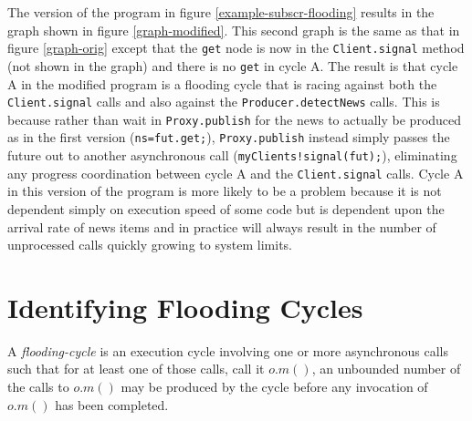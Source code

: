 \documentclass[12pt]{article}%
\begin{document}
The version of the program in figure \ref{example-subscr-flooding}
results in the graph shown in figure \ref{graph-modified}. This second graph is the same as that in figure \ref{graph-orig}
except that the \lstinline{get} node is now in the  \lstinline{Client.signal}
method (not shown in the graph) and there is no \lstinline{get} in cycle A. 
The result is that cycle A in the modified program
is a flooding cycle that is racing against both the
\lstinline{Client.signal} calls and also against the
\lstinline{Producer.detectNews} calls.  This is because rather than
wait in \lstinline{Proxy.publish} for the news to actually be produced
as in the first version (\lstinline{ns=fut.get;}),
\lstinline{Proxy.publish} instead simply passes the future out to
another asynchronous call (\lstinline{myClients!signal(fut);}),
eliminating any progress coordination between cycle A and the
\lstinline{Client.signal} calls. Cycle A in this version of the program is more likely to be a
problem because it is not dependent simply on execution speed of some
code but is dependent upon the arrival rate of news items and in
practice will always result in the number of unprocessed calls quickly
growing to system limits.

\section{Identifying Flooding Cycles}

\begin{definition}
\label{flooding-cycle}
A \emph{flooding-cycle} is an execution cycle 
involving one or more asynchronous calls
such that for at least one of those calls, call it $o.m()$,
an unbounded number of the calls to  $o.m()$ may be produced by the cycle
before any invocation of  $o.m()$ has been completed.
\end{definition}
\end{document}
